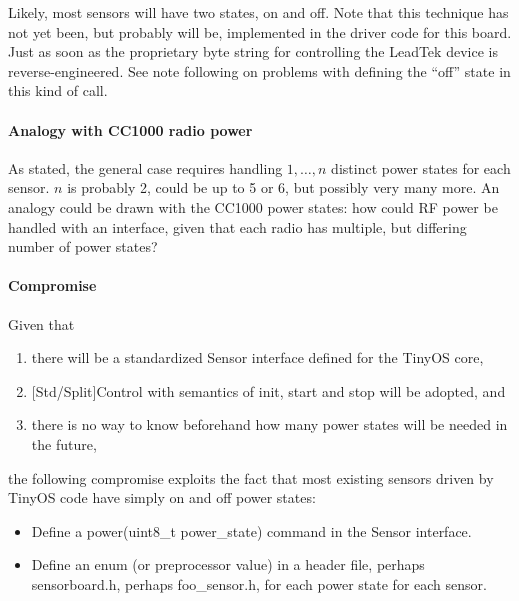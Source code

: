 \documentclass[10pt]{article}
\begin{document}
Likely, most sensors will have two states, on and off.
Note that this technique has not yet been, but probably will
be, implemented in the driver code for this board.
Just as soon as the proprietary byte string for 
controlling the LeadTek device is reverse-engineered.
See note following on problems with defining the ``off''
state in this kind of call.

\paragraph{Analogy with CC1000 radio power}
As stated, the general case requires handling
$1,\ldots,n$ distinct power states for each sensor.
$n$ is probably 2, could be up to 5 or 6, but 
possibly very many more.  An analogy could be 
drawn with the CC1000 power states:  how could 
RF power be handled with an interface, given that 
each radio has multiple, but differing number of 
power states?


\paragraph{Compromise}
Given that 
\begin{enumerate}
\item there will be a standardized Sensor interface
defined for the TinyOS core, 
\item $[$Std/Split$]$Control with semantics of 
init, start and stop will be adopted, and
\item there is no way to know beforehand how many 
power states will be needed in the future,
\end{enumerate}
the following compromise exploits the fact that 
most existing sensors driven by TinyOS code 
have simply on and off power states:

\begin{itemize}
\item Define a power(uint8\_t power\_state) command
in the Sensor interface.  
\item Define an enum (or preprocessor value) in 
a header file, perhaps sensorboard.h, perhaps 
foo\_sensor.h, for each
power state for each sensor.  
\end{itemize}
\end{document}
